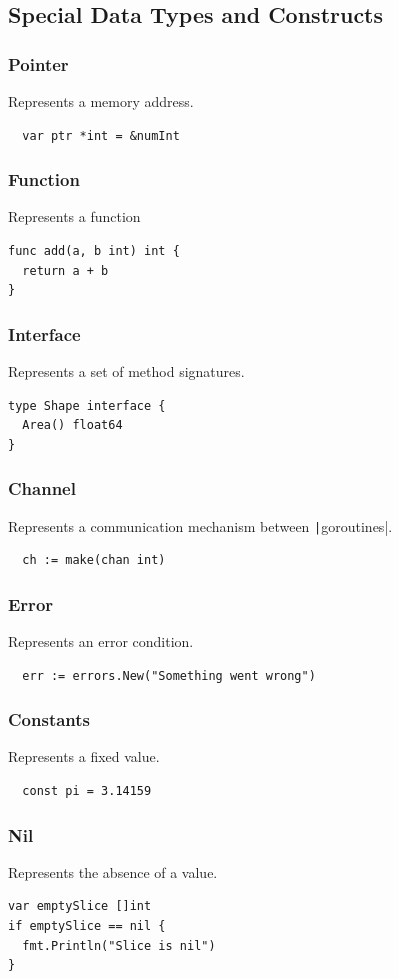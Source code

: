 \documentclass[letterpaper,12pt]{article}
\begin{document}
\subsection{Special Data Types and Constructs}

\subsubsection*{Pointer}
Represents a memory address.
\begin{verbatim}
  var ptr *int = &numInt
\end{verbatim}
\subsubsection*{Function}
Represents a function
\begin{verbatim}
func add(a, b int) int {
  return a + b
}
\end{verbatim}
\subsubsection*{Interface}
Represents a set of method signatures.
\begin{verbatim}
type Shape interface {
  Area() float64
}
\end{verbatim}
\subsubsection*{Channel}
Represents a communication mechanism between \texttt|goroutines|.
\begin{verbatim}
  ch := make(chan int)
\end{verbatim}
\subsubsection*{Error}
Represents an error condition.
\begin{verbatim}
  err := errors.New("Something went wrong")
\end{verbatim}
\subsubsection*{Constants}
Represents a fixed value.
\begin{verbatim}
  const pi = 3.14159
\end{verbatim}
\subsubsection*{Nil}
Represents the absence of a value.
\begin{verbatim}
var emptySlice []int
if emptySlice == nil {
  fmt.Println("Slice is nil")
}
\end{verbatim}
\end{document}
